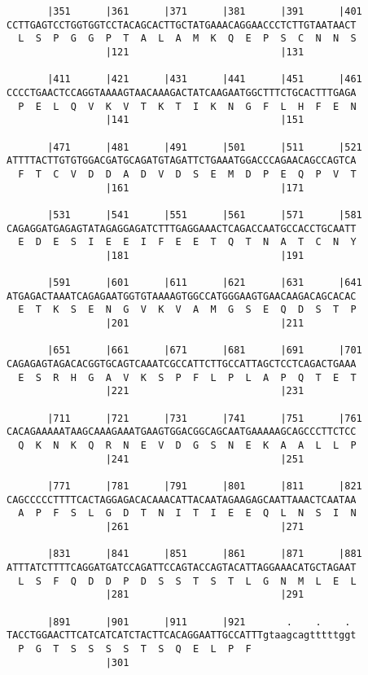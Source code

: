 \documentclass{article}
\begin{document}
\begin{Verbatim}
       |351      |361      |371      |381      |391      |401
CCTTGAGTCCTGGTGGTCCTACAGCACTTGCTATGAAACAGGAACCCTCTTGTAATAACT
  L  S  P  G  G  P  T  A  L  A  M  K  Q  E  P  S  C  N  N  S
                 |121                          |131         
  
       |411      |421      |431      |441      |451      |461
CCCCTGAACTCCAGGTAAAAGTAACAAAGACTATCAAGAATGGCTTTCTGCACTTTGAGA
  P  E  L  Q  V  K  V  T  K  T  I  K  N  G  F  L  H  F  E  N
                 |141                          |151         
  
       |471      |481      |491      |501      |511      |521
ATTTTACTTGTGTGGACGATGCAGATGTAGATTCTGAAATGGACCCAGAACAGCCAGTCA
  F  T  C  V  D  D  A  D  V  D  S  E  M  D  P  E  Q  P  V  T
                 |161                          |171         
  
       |531      |541      |551      |561      |571      |581
CAGAGGATGAGAGTATAGAGGAGATCTTTGAGGAAACTCAGACCAATGCCACCTGCAATT
  E  D  E  S  I  E  E  I  F  E  E  T  Q  T  N  A  T  C  N  Y
                 |181                          |191         
  
       |591      |601      |611      |621      |631      |641
ATGAGACTAAATCAGAGAATGGTGTAAAAGTGGCCATGGGAAGTGAACAAGACAGCACAC
  E  T  K  S  E  N  G  V  K  V  A  M  G  S  E  Q  D  S  T  P
                 |201                          |211         
  
       |651      |661      |671      |681      |691      |701
CAGAGAGTAGACACGGTGCAGTCAAATCGCCATTCTTGCCATTAGCTCCTCAGACTGAAA
  E  S  R  H  G  A  V  K  S  P  F  L  P  L  A  P  Q  T  E  T
                 |221                          |231         
  
       |711      |721      |731      |741      |751      |761
CACAGAAAAATAAGCAAAGAAATGAAGTGGACGGCAGCAATGAAAAAGCAGCCCTTCTCC
  Q  K  N  K  Q  R  N  E  V  D  G  S  N  E  K  A  A  L  L  P
                 |241                          |251         
  
       |771      |781      |791      |801      |811      |821
CAGCCCCCTTTTCACTAGGAGACACAAACATTACAATAGAAGAGCAATTAAACTCAATAA
  A  P  F  S  L  G  D  T  N  I  T  I  E  E  Q  L  N  S  I  N
                 |261                          |271         
  
       |831      |841      |851      |861      |871      |881
ATTTATCTTTTCAGGATGATCCAGATTCCAGTACCAGTACATTAGGAAACATGCTAGAAT
  L  S  F  Q  D  D  P  D  S  S  T  S  T  L  G  N  M  L  E  L
                 |281                          |291         
  
       |891      |901      |911      |921       .    .    . 
TACCTGGAACTTCATCATCATCTACTTCACAGGAATTGCCATTTgtaagcagtttttggt
  P  G  T  S  S  S  S  T  S  Q  E  L  P  F                  
                 |301                                       
  

\end{Verbatim}
\end{document}
